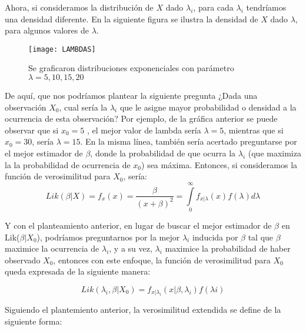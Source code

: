 \documentclass[11pt]{book}
\begin{document}
Ahora, si consideramos la distribución de $ X$ dado $\lambda_{i}$, para cada $\lambda_{i}$ tendríamos una densidad diferente. En la siguiente figura se ilustra la densidad de $X$ dado $\lambda$, para algunos valores de $ \lambda$.\\

\begin{figure}[h]
\centering
\texttt{[image: LAMBDAS]}
\caption{Se graficaron distribuciones exponenciales con parámetro $\lambda=5, 10, 15, 20$}
\end{figure}

De aquí, que nos podríamos plantear la siguiente pregunta ¿Dada una observación $ X_0$, cual sería la $ \lambda_{i}$ que le asigne mayor probabilidad o densidad a la ocurrencia de esta observación? Por ejemplo, de la gráfica anterior se puede observar que si $x_{0}=5$ , el mejor valor de lambda sería $\lambda=5$, mientras que si $x_{0}=30$, sería $\lambda=15$. En la misma línea, también sería acertado preguntarse por el mejor estimador de $\beta$, donde la probabilidad de que ocurra la $\lambda_{i}$ (que maximiza la la probabilidad de ocurrencia de $x_{0}$) sea máxima. Entonces, si consideramos la función de verosimilitud para $X_{0}$, sería:\\
\begin{equation*}
 Lik(\beta|X)=f_{x}(x)=\dfrac{\beta}{(x+\beta)^{2}}=\underset{0}{\overset{\infty }{\int }}f_{x|\lambda}(x)f(\lambda)d\lambda
\end{equation*}

 
Y con el planteamiento anterior, en lugar de buscar el mejor estimador de $\beta$ en Lik($\beta|X_{0}$), podríamos preguntarnos por la mejor $\lambda_{i}$ inducida por $\beta$ tal que $\beta$ maximice la ocurrencia de $\lambda_{i}$, y a su vez, $\lambda_{i}$ maximice la probabilidad de haber observado  $X_{0}$,  entonces con este enfoque, la función de verosimilitud para $X_{0}$ queda expresada de la siguiente manera:

\begin{equation*}
Lik(\lambda_{i},\beta|X_{0})=f_{x|\lambda_{i}}(x|\beta,\lambda_{i})f(\lambda{i})
\end{equation*}
	
	Siguiendo el plantemiento anterior, la verosimilitud extendida se define de la siguiente forma:\\
	
\end{document}
